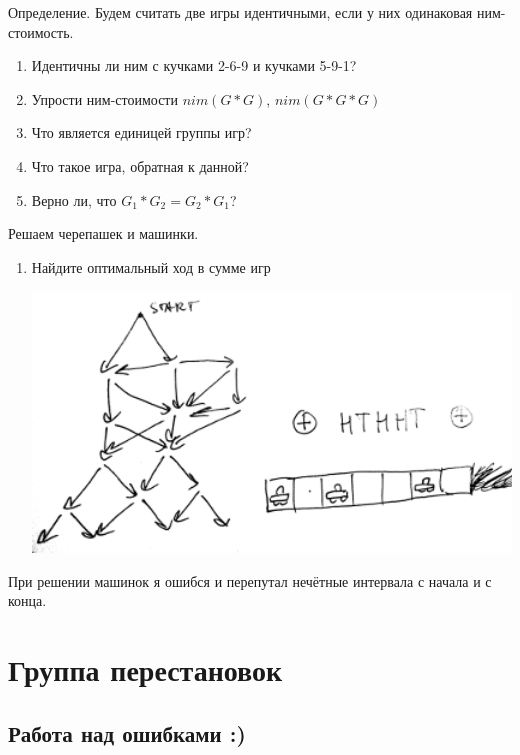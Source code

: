 \documentclass[12pt]{article} %
\begin{document}
Определение. Будем считать две игры идентичными, если у них одинаковая ним-стоимость.

\begin{enumerate}
  \item Идентичны ли ним с кучками 2-6-9 и кучками 5-9-1?
  \item Упрости ним-стоимости $nim(G * G)$, $nim(G * G * G)$
  \item Что является единицей группы игр?
  \item Что такое игра, обратная к данной?
  \item Верно ли, что $G_1 * G_2 = G_2 * G_1$?
\end{enumerate}


Решаем черепашек и машинки.

\begin{enumerate}
  \item Найдите оптимальный ход в сумме игр

  \begin{minipage}[c]{0.5\textwidth}
  \centering
          \includegraphics[width=16cm]{figure/game_sum.png}
  \end{minipage}

\end{enumerate}


При решении машинок я ошибся и перепутал нечётные интервала с начала и с конца.



\newpage

\section{Группа перестановок}

\subsection{Работа над ошибками :)}
\end{document}
